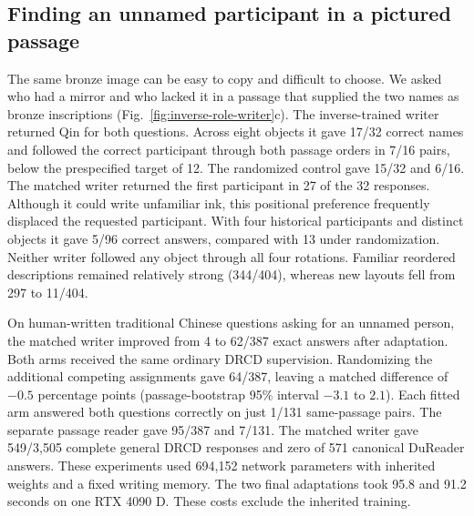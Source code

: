\subsection*{Finding an unnamed participant in a pictured passage}
The same bronze image can be easy to copy and difficult to choose. We asked who had a mirror and who lacked it in a passage that supplied the two names as bronze inscriptions (Fig.~\ref{fig:inverse-role-writer}c). The inverse-trained writer returned Qin for both questions. Across eight objects it gave 17/32 correct names and followed the correct participant through both passage orders in 7/16 pairs, below the prespecified target of 12. The randomized control gave 15/32 and 6/16. The matched writer returned the first participant in 27 of the 32 responses. Although it could write unfamiliar ink, this positional preference frequently displaced the requested participant. With four historical participants and distinct objects it gave 5/96 correct answers, compared with 13 under randomization. Neither writer followed any object through all four rotations. Familiar reordered descriptions remained relatively strong (344/404), whereas new layouts fell from 297 to 11/404.

On human-written traditional Chinese questions asking for an unnamed person, the matched writer improved from 4 to 62/387 exact answers after adaptation. Both arms received the same ordinary DRCD supervision. Randomizing the additional competing assignments gave 64/387, leaving a matched difference of $-0.5$ percentage points (passage-bootstrap 95\% interval $-3.1$ to $2.1$). Each fitted arm answered both questions correctly on just 1/131 same-passage pairs. The separate passage reader gave 95/387 and 7/131. The matched writer gave 549/3,505 complete general DRCD responses and zero of 571 canonical DuReader answers. These experiments used 694,152 network parameters with inherited weights and a fixed writing memory. The two final adaptations took 95.8 and 91.2 seconds on one RTX 4090 D. These costs exclude the inherited training.

